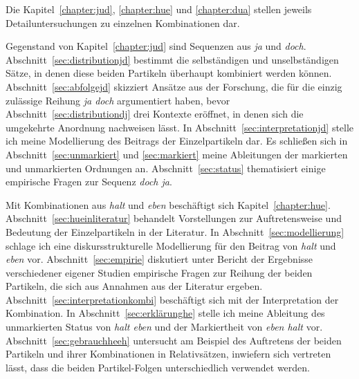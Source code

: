 Die Kapitel~\ref{chapter:jud}, \ref{chapter:hue} und \ref{chapter:dua} stellen jeweils Detailuntersuchungen zu einzelnen Kombinationen dar.

Gegenstand von Kapitel~\ref{chapter:jud} sind Sequenzen aus \textit{ja} und \textit{doch}. Abschnitt~\ref{sec:distributionjd} be\-stimmt die selbständigen und unselbständigen Sätze, in denen diese beiden Partikeln überhaupt kombiniert werden können. Abschnitt~\ref{sec:abfolgejd} skizziert Ansätze aus der Forschung, die für die einzig zulässige Reihung \textit{ja doch} argumentiert haben, bevor Abschnitt~\ref{sec:distributiondj} drei Kontexte eröffnet, in denen sich die umgekehrte Anordnung nachweisen lässt. In Abschnitt~\ref{sec:interpretationjd} stelle ich meine Modellierung des Beitrags der Einzelpartikeln dar. Es schließen sich in Abschnitt~\ref{sec:unmarkiert} und \ref{sec:markiert} meine Ableitungen der markierten und unmarkierten Ordnungen an. Abschnitt~\ref{sec:status} thematisiert einige empirische Fragen zur Sequenz \textit{doch ja}.

Mit Kombinationen aus \textit{halt} und \textit{eben} beschäftigt sich Kapitel~\ref{chapter:hue}. Abschnitt~\ref{sec:hueinliteratur} behandelt Vorstellungen zur Auftretensweise und Bedeutung der Einzelpartikeln in der Literatur. In Abschnitt~\ref{sec:modellierung} schlage ich eine diskursstrukturelle Modellierung für den Beitrag von \textit{halt} und \textit{eben} vor. Abschnitt~\ref{sec:empirie} diskutiert unter Bericht der Ergebnisse verschiedener eigener Studien empirische Fragen zur Reihung der beiden Partikeln, die sich aus Annahmen aus der Literatur ergeben. Abschnitt~\ref{sec:interpretationkombi} beschäftigt sich mit der Interpretation der Kombination. In Abschnitt~\ref{sec:erklärunghe} stelle ich meine Ableitung des unmarkierten Status von \textit{halt eben} und der Markiertheit von \textit{eben halt} vor. Abschnitt~\ref{sec:gebrauchheeh} untersucht am Beispiel des Auftretens der beiden Partikeln und ihrer Kombinationen in Relativsätzen, inwiefern sich vertreten lässt, dass die beiden Partikel-Folgen unterschiedlich verwendet werden.

